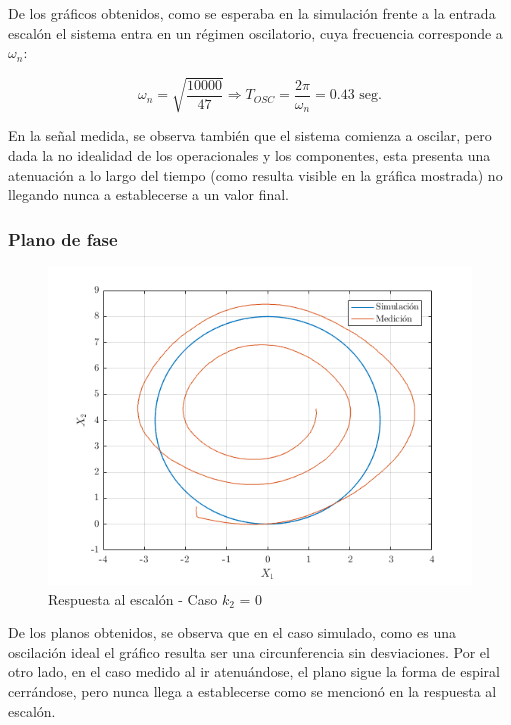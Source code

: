 \documentclass{article}
\begin{document}
De los gráficos obtenidos, como se esperaba en la simulación frente a la entrada escalón el sistema entra en un régimen oscilatorio, cuya frecuencia corresponde a $\omega_n$:

\[
\omega_n = \sqrt{\frac{10000}{47}} \Longrightarrow T_{OSC} = \frac{2 \pi}{\omega_n} = \textrm{0.43 seg.}
\]

En la señal medida, se observa también que el sistema comienza a oscilar, pero dada la no idealidad de los operacionales y los componentes, esta presenta una atenuación a lo largo del tiempo (como resulta visible en la gráfica mostrada) no llegando nunca a establecerse a un valor final.

\subsubsection{Plano de fase}

\begin{figure}[H]
\centering
\includegraphics[width=0.8\linewidth]{../graficos-xy/xy-sin-k.png}
\caption{Respuesta al escalón - Caso $k_2$ = 0}
\label{fig:escalonSinK2}
\end{figure}

De los planos obtenidos, se observa que en el caso simulado, como es una oscilación ideal el gráfico resulta ser una circunferencia sin desviaciones. Por el otro lado, en el caso medido al ir atenuándose, el plano sigue la forma de espiral cerrándose, pero nunca llega a establecerse como se mencionó en la respuesta al escalón.
\end{document}
